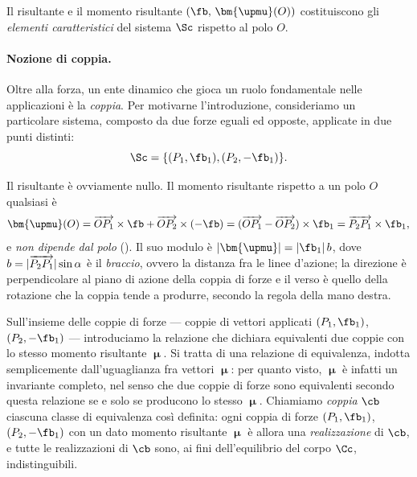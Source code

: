 %
%



Il risultante e il momento risultante $(\fb,\,\bm{\upmu}(O))$ costituiscono gli
\textit{elementi caratteristici} del sistema $\Sc$ rispetto al
polo $O$.

\paragraph{Nozione di coppia.}
Oltre alla forza, un ente dinamico che gioca un ruolo fondamentale nelle applicazioni è la \textit{coppia}. 
Per motivarne l'introduzione, consideriamo un particolare sistema, composto da due forze eguali ed opposte, applicate
in due punti distinti:
\begin{equation}
	\Sc= \{ (P_1, \fb_1), (P_2, -\fb_1)  \}.
\end{equation}


Il risultante è ovviamente nullo. Il momento risultante rispetto a un polo $O$ qualsiasi è
\begin{equation}\label{eq:coppia}
	\bm{\upmu}(O)
	= \overrightarrow{OP_1} \times \fb
	+ \overrightarrow{OP_2} \times (-\fb)
	= (\overrightarrow{OP_1} - \overrightarrow{OP_2})
	\times \fb_1
	= \overrightarrow{P_2P_1} \times \fb_1,
\end{equation}
e \textit{non dipende dal polo} (). Il suo modulo è
$|\bm{\upmu}| = |\fb_1|\,b$, dove
$b = |\protect\overrightarrow{P_2P_1}|\sin\alpha$ è il
\textit{braccio}, ovvero la distanza fra le linee d'azione;
la direzione è perpendicolare al piano di azione della coppia  di forze e il verso
è quello della rotazione che la coppia tende a produrre,
secondo la regola della mano destra.

Sull'insieme delle coppie di forze --- coppie di vettori applicati
$(P_1,\fb_1)$, $(P_2,-\fb_1)$ --- introduciamo la relazione che dichiara
equivalenti due coppie con lo stesso momento risultante $\bm{\upmu}$.
Si tratta di una relazione di equivalenza, indotta semplicemente
dall'uguaglianza fra vettori $\bm{\upmu}$: per quanto visto, $\bm{\upmu}$
è infatti un invariante completo, nel senso che due coppie di forze sono
equivalenti secondo questa relazione se e solo se producono lo stesso
$\bm{\upmu}$. Chiamiamo \textit{coppia} $\cb$ ciascuna
classe di equivalenza così definita: ogni coppia di forze $(P_1,\fb_1)$,
$(P_2,-\fb_1)$ con un dato momento risultante $\bm{\upmu}$ è allora una
\textit{realizzazione} di $\cb$, e tutte le realizzazioni di $\cb$ sono,
ai fini dell'equilibrio del corpo $\Cc$, indistinguibili.




